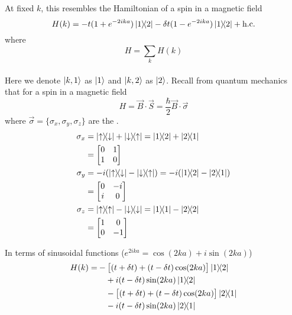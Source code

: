 \documentclass[12pt,a4paper,titlepage]{article}
\newcommand{\trm}[1]{\textrm{#1}} %
\newcommand{\up}{\uparrow} %
\newcommand{\dn}{\downarrow} %
\newcommand{\ul}[1]{\underline{\smash{#1}}} %
\begin{document}
At fixed $k$, this resembles the Hamiltonian of a spin in a magnetic field
\begin{equation}
H(k)=-t(1+e^{-2ika})\ketbra{1}{2}-\delta t(1-e^{-2ika})\ketbra{1}{2}+\trm{h.c.}
\end{equation}
where
\begin{equation}
H=\sum_{k}H(k)
\end{equation}\\

Here we denote $\ket{k,1}$ as $\ket{1}$ and $\ket{k,2}$ as $\ket{2}$. Recall from quantum mechanics that for a spin in a magnetic field
\begin{equation}
H=\vec{B}\cdot\vec{S}=\frac{\hbar}{2}\vec{B}\cdot\vec{\sigma}
\end{equation}
where $\vec{\sigma}=\{\sigma_{x},\sigma_{y},\sigma_{z}\}$ are the \ul{Pauli matrices}.
\begin{equation}
\begin{aligned}
\sigma_{x}&=\ketbra{\up}{\dn}+\ketbra{\dn}{\up}=\ketbra{1}{2}+\ketbra{2}{1}\\
&=\begin{bmatrix}
0 & 1\\
1 & 0
\end{bmatrix}\\
\sigma_{y}&=-i(\ketbra{\up}{\dn}-\ketbra{\dn}{\up})=-i(\ketbra{1}{2}-\ketbra{2}{1})\\
&=\begin{bmatrix}
0 & -i\\
i & 0
\end{bmatrix}\\
\sigma_{z}&=\ketbra{\up}{\up}-\ketbra{\dn}{\dn}=\ketbra{1}{1}-\ketbra{2}{2}\\
&=\begin{bmatrix}
1 & 0\\
0 & -1
\end{bmatrix}
\end{aligned}
\end{equation}

In terms of sinusoidal functions ($e^{2ika}=\cos(2ka)+i\sin(2ka)$)
\begin{equation}
\begin{aligned}
H(k)=&-\big[(t+\delta t)+(t-\delta t)\cos(2ka)\big]\ketbra{1}{2}\\
&\quad+i(t-\delta t)\sin(2ka)\ketbra{1}{2}\\
&\quad-\big[(t+\delta t)+(t-\delta t)\cos(2ka)\big]\ketbra{2}{1}\\
&\quad-i(t-\delta t)\sin(2ka)\ketbra{2}{1}
\end{aligned}
\end{equation}
\end{document}
